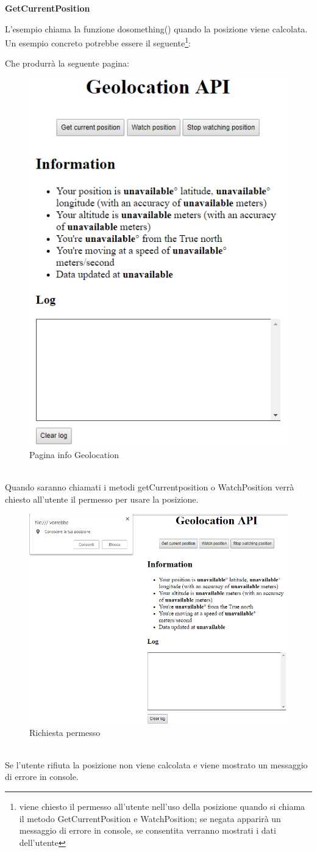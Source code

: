 \documentclass[11pt ,a4paper , twoside , openright ]{article}
\begin{document}
\textbf{GetCurrentPosition}

L'esempio chiama la funzione dosomething() quando la posizione viene calcolata. \\
Un esempio concreto potrebbe essere il seguente\footnote{viene chiesto il permesso all'utente nell'uso della posizione quando si chiama il metodo GetCurrentPosition e WatchPosition; se negata apparirà un messaggio di errore in console, se consentita verranno mostrati i dati dell'utente}: \\
\pagebreak

Che produrrà la seguente pagina:
\begin{figure}[h]
	\centering
	\includegraphics[width=0.4\linewidth]{geo1}
	\caption{Pagina info Geolocation}
	\label{fig: Pagina info Geolocation}
\end{figure}
\pagebreak
\\
Quando saranno chiamati i metodi getCurrentposition o WatchPosition verrà chiesto all'utente il permesso per usare la posizione.
\begin{figure}[h]
	\centering
	\includegraphics[width=0.4\linewidth]{geo2}
	\caption{Richiesta permesso}
	\label{fig: Richiesta permesso}
\end{figure}
\\
Se l'utente rifiuta la posizione non viene calcolata e viene mostrato un messaggio di errore in console.
\end{document}
